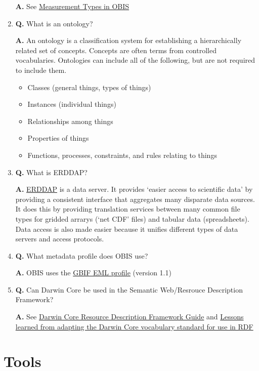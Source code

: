 \documentclass[
]{book}
\providecommand{\tightlist}{%
  \setlength{\itemsep}{0pt}\setlength{\parskip}{0pt}}
\begin{document}
\begin{enumerate}
  \textbf{A.} See \href{https://mof.obis.org/}{Measurement Types in OBIS}
\item
  \textbf{Q.} What is an ontology?

  \textbf{A.} An ontology is a classification system for establishing a hierarchically related set of concepts. Concepts are often terms from controlled vocabularies. Ontologies can include all of the following, but are not required to include them.

  \begin{itemize}
  \tightlist
  \item
    Classes (general things, types of things)
  \item
    Instances (individual things)
  \item
    Relationships among things
  \item
    Properties of things
  \item
    Functions, processes, constraints, and rules relating to things
  \end{itemize}
\item
  \textbf{Q.} What is ERDDAP?

  \textbf{A.} \href{https://coastwatch.pfeg.noaa.gov/erddap/index.html}{ERDDAP} is a data server. It provides `easier access to scientific data' by providing a consistent interface that aggregates many disparate data sources. It does this by providing translation services between many common file types for gridded arrarys (`net CDF' files) and tabular data (spreadsheets). Data access is also made easier because it unifies different types of data servers and access protocols.
\item
  \textbf{Q.} What metadata profile does OBIS use?

  \textbf{A.} OBIS uses the \href{http://rs.gbif.org/schema/eml-gbif-profile/1.1/eml-gbif-profile.xsd}{GBIF EML profile} (version 1.1)
\item
  \textbf{Q.} Can Darwin Core be used in the Semantic Web/Resrouce Description Framework?

  \textbf{A.} See \href{https://dwc.tdwg.org/rdf/}{Darwin Core Resource Description Framework Guide} and \href{http://www.semantic-web-journal.net/system/files/swj1093.pdf}{Lessons learned from adapting the Darwin Core vocabulary standard for use in RDF}
\end{enumerate}

\hypertarget{tools}{%
\chapter{Tools}\label{tools}}
\end{document}

